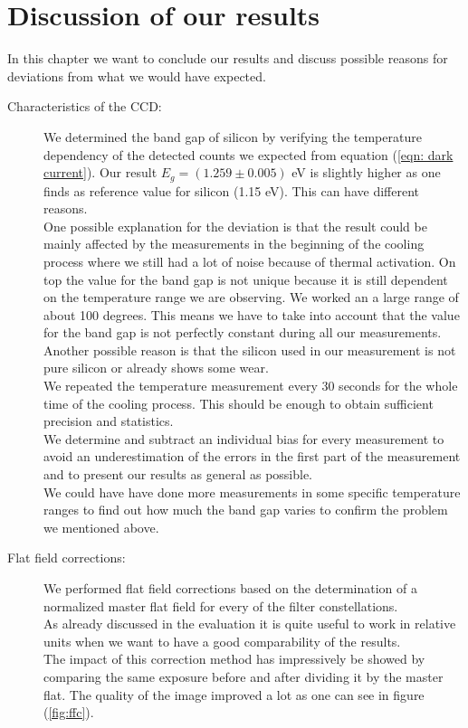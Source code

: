 \chapter{Discussion of our results}
In this chapter we want to conclude our results and discuss possible reasons for deviations from what we would have expected. \\
\begin{description}
	\item[Characteristics of the CCD:] We determined the band gap of silicon by verifying the temperature dependency of the detected counts we expected from equation (\ref{eqn: dark current}). Our result $E_g = (1.259 \pm 0.005)$ eV is slightly higher as one finds as reference value for silicon (1.15 eV). This can have different reasons. \\ One possible explanation for the deviation is that the  result could be mainly affected by the  measurements in the beginning  of the cooling process where we still had a lot of noise because of thermal activation. On top the value for the band gap is not unique because it is still dependent on the temperature range we are observing. We worked an a large range of about 100 degrees. This means we have to take into account that the value for the band gap is not perfectly constant during all our measurements. \\ Another possible reason is that the silicon  used in our measurement is not pure silicon or  already shows some wear. \\ We repeated the temperature measurement every 30 seconds for the whole time of the cooling process. This should be enough to obtain sufficient precision and statistics. \\
		We determine and subtract an individual bias for every measurement to avoid an underestimation of the errors in the first part of the measurement and to present our results as general as possible. \\
		 We could have have done more measurements in some specific temperature ranges to find out how much the band gap varies to confirm the problem we mentioned above. 
	\item[Flat field corrections:] We performed flat field corrections based on the determination of a normalized master flat field for every of the filter constellations. \\ As already discussed in the evaluation it is quite useful to work in relative units when we want to have a good comparability of the results.\\ The impact of this correction method has impressively be showed by comparing the same exposure before and after dividing it by the master flat. The quality of the image improved a lot as one can see in figure (\ref{fig:ffc}). \\

\end{description}
